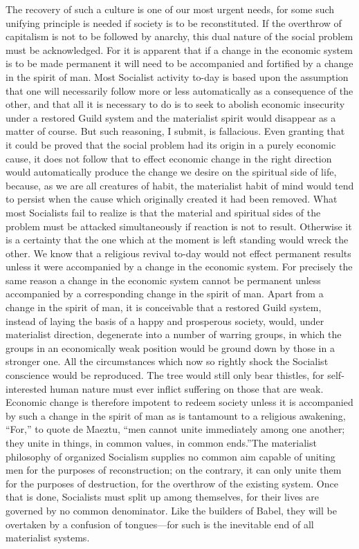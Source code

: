 \documentclass{book}
\begin{document}
The recovery of such a culture is one of our most urgent needs, for some such unifying principle is needed if society is to be reconstituted. If the overthrow of capitalism is not to be followed by anarchy, this dual nature of the social problem must be acknowledged. For it is apparent that if a change in the economic system is to be made permanent it will need to be accompanied and fortified by a change in the spirit of man. Most Socialist activity to-day is based upon the assumption that one will necessarily follow more or less automatically as a consequence of the other, and that all it is necessary to do is to seek to abolish economic insecurity under a restored Guild system and the materialist spirit would disappear as a matter of course. But such reasoning, I submit, is fallacious. Even granting that it could be proved that the social problem had its origin in a purely economic cause, it does not follow that to effect economic change in the right direction would automatically produce the change we desire on the spiritual side of life, because, as we are all creatures of habit, the materialist habit of mind would tend to persist when the cause which originally created it had been removed. What most Socialists fail to realize is that the material and spiritual sides of the problem must be attacked simultaneously if reaction is not to result. Otherwise it is a certainty that the one which at the moment is left standing would wreck the other. We know that a religious revival to-day would not effect permanent results unless it were accompanied by a change in the economic system. For precisely the same reason a change in the economic system cannot be permanent unless accompanied by a corresponding change in the spirit of man. Apart from a change in the spirit of man, it is conceivable that a restored Guild system, instead of laying the basis of a happy and prosperous society, would, under materialist direction, degenerate into a number of warring groups, in which the groups in an economically weak position would be ground down by those in a stronger one. All the circumstances which now so rightly shock the Socialist conscience would be reproduced. The tree would still only bear thistles, for self-interested human nature must ever inflict suffering on those that are weak. Economic change is therefore impotent to redeem society unless it is accompanied by such a change in the spirit of man as is tantamount to a religious awakening, “For,” to quote de Maeztu, “men cannot unite immediately among one another; they unite in things, in common values, in common ends.”\footnotemark[1] The materialist philosophy of organized Socialism supplies no common aim capable of uniting men for the purposes of reconstruction; on the contrary, it can only unite them for the purposes of destruction, for the overthrow of the existing system. Once that is done, Socialists must split up among themselves, for their lives are governed by no common denominator. Like the builders of Babel, they will be overtaken by a confusion of tongues—for such is the inevitable end of all materialist systems.
\end{document}
